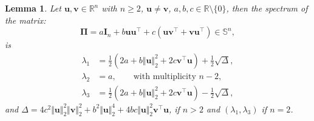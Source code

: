 \documentclass[a4paper, 12pt]{article}
\newcommand{\trace}{\mathrm{trace}}
\newcommand{\T}{\top}
\def\bPi{\boldsymbol{\Pi}}
\def\bu{\boldsymbol{u}}
\def\bv{\boldsymbol{v}}
\def\bu{\mathbf{u}}
\def\bv{\mathbf{v}}
\newtheorem{lemma}{Lemma}
\begin{document}
\begin{lemma}
\label{lemma:Pi_eigenvalues_all}
Let $\boldsymbol{u},\boldsymbol{v} \in \mathbb{R}^n$ with $n\geq 2$, $\bu\neq\bv$, $a,b,c\in\mathbb{R}\setminus \{0\}$, then the spectrum of the matrix:
\begin{equation*}
\boldsymbol{\Pi} = a \boldsymbol{I}_n + b \boldsymbol{u} \boldsymbol{u}^{\T} + c(\boldsymbol{u}\boldsymbol{v}^{\T} + \boldsymbol{v}\boldsymbol{u}^{\T})\in\mathbb{S}^n,
\end{equation*}
is
%
\begin{align*}
\lambda_1 &= \frac{1}{2}(2 a+b \Vert\bu\Vert_2^2+2 c \bv^{\T}\bu) + \frac{1}{2}\sqrt{\Delta}, \\
\lambda_2 &= a, \qquad \text{with multiplicity } n - 2, \\
\lambda_3 &= \frac{1}{2}(2 a+b \Vert\bu\Vert_2^2+2 c \bv^{\T}\bu) - \frac{1}{2}\sqrt{\Delta},
\end{align*}
and $\Delta =4c^2\Vert\bu\Vert_2^2\Vert\bv\Vert_2^2+b^2\Vert\bu\Vert_2^4+4bc\Vert\bu\Vert_2^2\bv^{\T}\bu$, if $n>2$ and $(\lambda_1,\lambda_3)$ if $n=2$.
%
\end{lemma}
\end{document}
